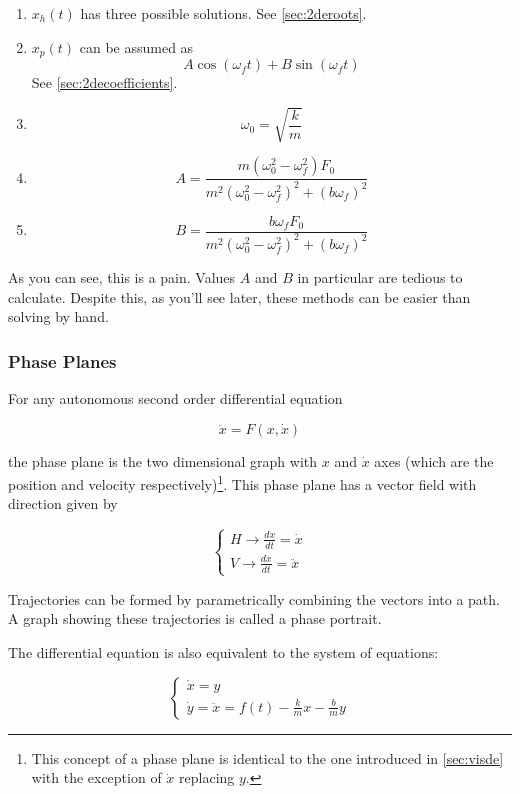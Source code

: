         \begin{enumerate}
            \item $x_h(t)$ has three possible solutions. See \eqref{sec:2deroots}.
            \item $x_p(t)$ can be assumed as
                \[ A \cos ( \omega_f t ) + B \sin ( \omega_f t )\]
                See \eqref{sec:2decoefficients}.
            \item \[ \omega_0 = \sqrt{\frac{k}{m} } \]
            \item \[ A = \frac{m (\omega_0^2 - \omega_f^2) F_0}{m^2{(\omega_0^2 - \omega_f^2)}^2 + {(b \omega_f)}^2} \]
            \item \[ B = \frac{b \omega_f F_0}{m^2{(\omega_0^2 - \omega_f^2)}^2 + {(b \omega_f)}^2} \]
        \end{enumerate}

        As you can see, this is a pain. Values $A$ and $B$ in particular are tedious to calculate. Despite this, as you'll see later, these methods can be easier than solving by hand.

        \subsubsection{Phase Planes}\label{sec:2depplane}
        For any autonomous second order differential equation

            \[ \ddot{x} = F(x, \dot{x}) \]

        the phase plane is the two dimensional graph with $x$ and $\dot{x}$ axes (which are the position and velocity respectively)\footnote{This concept of a phase plane is identical to the one introduced in \eqref{sec:visde} with the exception of $\dot{x}$ replacing $y$.}. This phase plane has a vector field with direction given by

            \[ \begin{cases}
                    H \to \frac{dx}{dt} = \dot{x}\\
                    V \to \frac{d\dot{x} }{dt} = \ddot{x}
                \end{cases} \]

        Trajectories can be formed by parametrically combining the vectors into a path. A graph showing these trajectories is called a phase portrait.

        The differential equation is also equivalent to the system of equations:

            \[ \begin{cases}
                    \dot{x} = y\\
                    \dot{y} = \ddot{x} = f(t) - \frac{k}{m} x - \frac{b}{m} y
                \end{cases} \]

